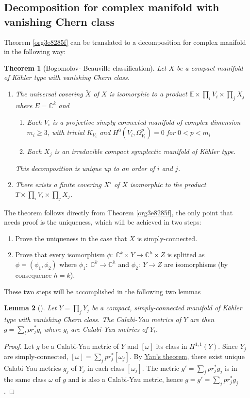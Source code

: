 \documentclass[11pt]{article}
\newtheorem{theorem}{Theorem}
\newtheorem{lemma}[theorem]{Lemma}
\begin{document}
\subsection{Decomposition for complex manifold with vanishing Chern class}
\label{sec:org7b45fda}

Theorem \ref{org3e8285f} can be translated to a decomposition for complex manifold in the following
way:
\begin{theorem}[Bogomolov- Beauville classification]
Let \(X\) be a compact manifold of Kähler type with vanishing Chern class.
\begin{enumerate}
\item The universal covering \(\tilde X\) of \(X\) is isomorphic to a product \(\mathbb{E}\times \prod_i
   V_i\times\prod_j X_j\) where \(E = \mathbb{C}^k\) and
\begin{enumerate}
\item Each \(V_i\) is a projective simply-connected manifold of complex dimension \(m_i\geq 3\), with trivial
\(K_{V_i}\) and \(H^0(V_i,\Omega_{V_i}^p) = 0\) for \(0 < p < m_i\)
\item Each \(X_j\) is an irreducible compact symplectic manifold of Kähler type.
\end{enumerate}
This decomposition is unique up to an order of \(i\) and \(j\).
\item There exists a finite covering \(X'\) of \(X\) isomorphic to the product \(T\times\prod_i
   V_i\times\prod_j X_j\).
\end{enumerate}
\end{theorem}
The theorem follows directly from Theorem \ref{org3e8285f}, the only point that needs proof is the
uniqueness, which will be achieved in two steps:
\begin{enumerate}
\item Prove the uniqueness in the case that \(X\) is simply-connected.
\item Prove that every isomorphism \(\phi:\ \mathbb{C}^k\times Y\longrightarrow \mathbb{C}^h\times Z\) is
splitted as \(\phi = (\phi_1,\phi_2)\) where \(\phi_1:\ \mathbb{C}^k\longrightarrow \mathbb{C}^h\) and
\(\phi_2:\ Y\longrightarrow Z\) are isomorphisms (by consequence \(h=k\)).
\end{enumerate}
These two steps will be accomplished in the following two lemmas

\begin{lemma}[]
Let \(Y = \prod_j Y_j\) be a compact, simply-connected manifold of Kähler type with vanishing Chern
class. The Calabi-Yau metrics of \(Y\) are then \(g = \sum_l pr_j^*g_l\) where \(g_l\) are Calabi-Yau metrics
of \(Y_l\).
\end{lemma}
\begin{proof}
Let \(g\) be a Calabi-Yau metric of \(Y\) and \([\omega]\) its class in \(H^{1,1}(Y)\). Since \(Y_j\) are
simply-connected, \([\omega] = \sum_j pr_j^* [\omega_j]\). By \href{calabi-yau.org}{Yau's theorem}, there exist unique Calabi-Yau
metrics \(g_j\) of \(Y_j\) in each class \([\omega_j]\). The metric \(g' = \sum_j pr_j^* g_j\) is in the same
class \(\omega\) of \(g\) and is also a Calabi-Yau metric, hence \(g= g' = \sum_j pr_j^*g_j\).
\end{proof}
\end{document}
